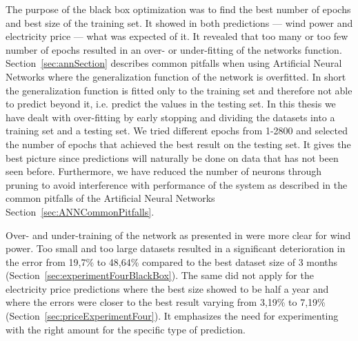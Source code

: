 The purpose of the black box optimization was to find the best number of epochs and best size of the training set. It showed in both predictions --- wind power and electricity price --- what was expected of it. It revealed that too many or too few number of epochs resulted in an over- or under-fitting of the networks function. Section~\ref{sec:annSection} describes common pitfalls when using Artificial Neural Networks where the generalization function of the network is overfitted. In short the generalization function is fitted only to the training set and therefore not able to predict beyond it, i.e. predict the values in the testing set. In this thesis we have dealt with over-fitting by early stopping and dividing the datasets into a training set and a testing set. We tried different epochs from 1-2800 and selected the number of epochs that achieved the best result on the testing set. It gives the best picture since predictions will naturally be done on data that has not been seen before. Furthermore, we have reduced the number of neurons through pruning to avoid interference with performance of the system as described in the common pitfalls of the Artificial Neural Networks Section~\ref{sec:ANNCommonPitfalls}.

Over- and under-training of the network as presented in\cite{1} were more clear for wind power. Too small and too large datasets resulted in a significant deterioration in the error from 19,7\% to 48,64\% compared to the best dataset size of 3 months (Section~\ref{sec:experimentFourBlackBox}). The same did not apply for the electricity price predictions where the best size showed to be half a year and where the errors were closer to the best result varying from 3,19\% to 7,19\% (Section~\ref{sec:priceExperimentFour}). It emphasizes the need for experimenting with the right amount for the specific type of prediction.


